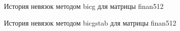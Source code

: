 \begin{figure}[H]
    \renewcommand{\figurename}{Рисунок}
    \caption{История невязок методом bicg для матрицы finan512}
    \label{fig:image_33}
\end{figure}

\begin{figure}[H]
    \renewcommand{\figurename}{Рисунок}
    \caption{История невязок методом bicgstab для матрицы finan512}
    \label{fig:image_34}
\end{figure}

